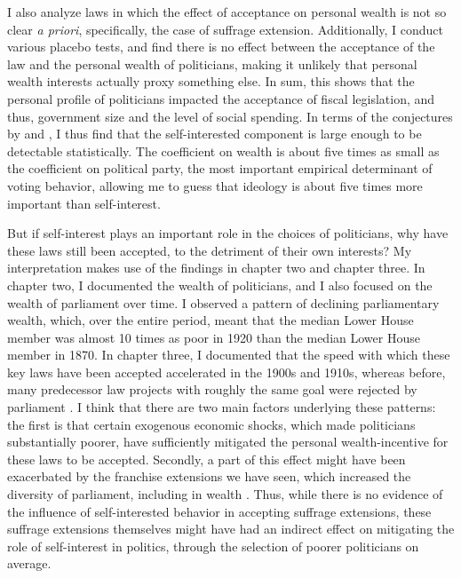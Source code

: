 I also analyze laws in which the effect of acceptance on personal wealth is not so clear \textit{a priori}, specifically, the case of suffrage extension. Additionally, I conduct various placebo tests, and find there is no effect between the acceptance of the law and the personal wealth of politicians, making it unlikely that personal wealth interests actually proxy something else. In sum, this shows that the personal profile of politicians impacted the acceptance of fiscal legislation, and thus, government size and the level of social spending. In terms of the conjectures by \cite{tahoun2019personal} and \cite{grossman1996electoral}, I thus find that the self-interested component is large enough to be detectable statistically. The coefficient on wealth is about five times as small as the coefficient on political party, the most important empirical determinant of voting behavior, allowing me to guess that ideology is about five times more important than self-interest. 

But if self-interest plays an important role in the choices of politicians, why have these laws still been accepted, to the detriment of their own interests? My interpretation makes use of the findings in chapter two and chapter three. In chapter two, I documented the wealth of politicians, and I also focused on the wealth of parliament over time. I observed a pattern of declining parliamentary wealth, which, over the entire period, meant that the median Lower House member was almost 10 times as poor in 1920 than the median Lower House member in 1870. In chapter three, I documented that the speed with which these key laws have been accepted accelerated in the 1900s and 1910s, whereas before, many predecessor law projects with roughly the same goal were rejected by parliament \citep{smit2002omwille, van2013eerste}. I think that there are two main factors underlying these patterns: the first is that certain exogenous economic shocks, which made politicians substantially poorer, have sufficiently mitigated the personal wealth-incentive for these laws to be accepted. Secondly, a part of this effect might have been exacerbated by the franchise extensions we have seen, which increased the diversity of parliament, including in wealth \citep{van1983toegang}. Thus, while there is no evidence of the influence of self-interested behavior in accepting suffrage extensions, these suffrage extensions themselves might have had an indirect effect on mitigating the role of self-interest in politics, through the selection of poorer politicians on average.

